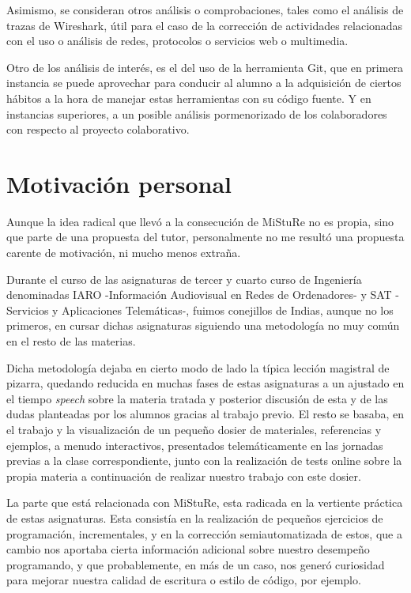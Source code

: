 Asimismo,  se consideran otros análisis o comprobaciones, tales como el análisis de trazas de Wireshark, útil para el caso de la corrección de actividades relacionadas con el uso o análisis de redes, protocolos o servicios web o multimedia.


Otro de los análisis de interés, es el del uso de la herramienta Git, que en primera instancia se puede aprovechar para conducir al alumno a la adquisición de ciertos hábitos a la hora de manejar estas herramientas con su código fuente. Y en instancias superiores, a un posible análisis pormenorizado de los colaboradores con respecto al proyecto colaborativo.


\section{Motivación personal}

Aunque la idea radical que llevó a la consecución de MiStuRe no es propia, sino que parte de una propuesta del tutor, personalmente no me resultó una propuesta carente de motivación, ni mucho menos extraña.


Durante el curso de las asignaturas de tercer y cuarto curso de Ingeniería denominadas IARO -Información Audiovisual en Redes de Ordenadores- y SAT -Servicios y Aplicaciones Telemáticas-, fuimos conejillos de Indias, aunque no los primeros, en cursar dichas asignaturas siguiendo una metodología no muy común en el resto de las materias.


Dicha metodología dejaba en cierto modo de lado la típica lección magistral de pizarra, quedando reducida en muchas fases de estas asignaturas a un ajustado en el tiempo \textit{speech} sobre la materia tratada y posterior discusión de esta y de las dudas planteadas por los alumnos gracias al trabajo previo. El resto se basaba, en el trabajo y la visualización de un pequeño dosier de materiales, referencias y ejemplos, a menudo interactivos, presentados telemáticamente en las jornadas previas a la clase correspondiente, junto con la realización de tests online sobre la propia materia a continuación de realizar nuestro trabajo con este dosier.


La parte que está relacionada con MiStuRe, esta radicada en la vertiente práctica de estas asignaturas. Esta consistía en la realización de pequeños ejercicios de programación, incrementales, y en la corrección semiautomatizada de estos, que a cambio nos aportaba cierta información adicional sobre nuestro desempeño programando, y que probablemente, en más de un caso, nos generó curiosidad para mejorar nuestra calidad de escritura o estilo de código, por ejemplo.


